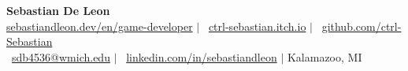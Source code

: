 \documentclass[letterpaper,10pt]{article}
\begin{document}
\begin{center}
	{\LARGE\textbf{Sebastian De Leon}} \\
	\vspace{0.05cm}
	\small\faGlobe \hspace{0.15cm}\href{https://sebastiandleon.dev/en/game-developer}{sebastiandleon.dev/en/game-developer} $|$
	\faGamepad\ \href{https://ctrl-sebastian.itch.io}{ctrl-sebastian.itch.io} $|$
	\faGithub\ \href{https://github.com/ctrl-Sebastian}{github.com/ctrl-Sebastian} \\
	\small\faEnvelope\ \href{mailto:sdb4536@wmich.edu}{sdb4536@wmich.edu} $|$
	\faLinkedin\ \href{https://www.linkedin.com/in/sebastiandleon/}{linkedin.com/in/sebastiandleon} $|$
	\small Kalamazoo, MI
\end{center}
\vspace{-4.5mm}






\end{document}
